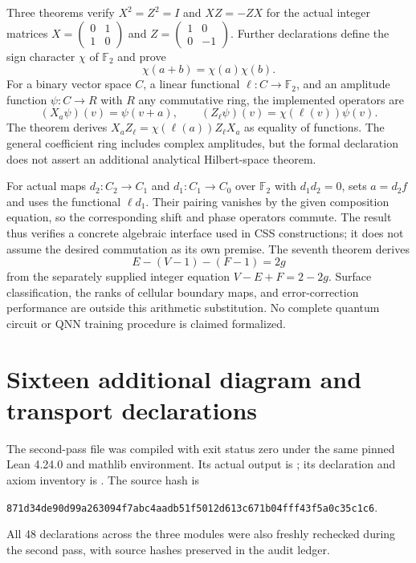 Three theorems verify $X^2=Z^2=I$ and $XZ=-ZX$ for the actual integer
matrices $X=\left(\begin{smallmatrix}0&1\\1&0\end{smallmatrix}\right)$ and
$Z=\left(\begin{smallmatrix}1&0\\0&-1\end{smallmatrix}\right)$. Further
declarations define the sign character $\chi$ of $\mathbb F_2$ and prove
\[
 \chi(a+b)=\chi(a)\chi(b).
\]
For a binary vector space $C$, a linear functional $\ell:C\to\mathbb F_2$,
and an amplitude function $\psi:C\to R$ with $R$ any commutative ring, the
implemented operators are
\[
 (X_a\psi)(v)=\psi(v+a),\qquad
 (Z_\ell\psi)(v)=\chi(\ell(v))\psi(v).
\]
The theorem  derives
$X_aZ_\ell=\chi(\ell(a))Z_\ell X_a$ as equality of functions. The general
coefficient ring includes complex amplitudes, but the formal declaration
does not assert an additional analytical Hilbert-space theorem.

For actual maps $d_2:C_2\to C_1$ and $d_1:C_1\to C_0$ over $\mathbb F_2$
with $d_1d_2=0$,  sets $a=d_2f$ and
uses the functional $\ell d_1$. Their pairing vanishes by the given
composition equation, so the corresponding shift and phase operators
commute. The result thus verifies a concrete algebraic interface used in
CSS constructions; it does not assume the desired commutation as its own
premise. The seventh theorem derives
\[
 E-(V-1)-(F-1)=2g
\]
from the separately supplied integer equation $V-E+F=2-2g$. Surface
classification, the ranks of cellular boundary maps, and error-correction
performance are outside this arithmetic substitution. No complete quantum
circuit or QNN training procedure is claimed formalized.

\section{Sixteen additional diagram and transport declarations}

The second-pass file  was compiled with exit
status zero under the same pinned Lean 4.24.0 and mathlib environment.
Its actual output is ; its declaration and
axiom inventory is . The source hash is
\begin{center}\scriptsize
\texttt{871d34de90d99a263094f7abc4aadb51f5012d613c671b04fff43f5a0c35c1c6}.
\end{center}
All 48 declarations across the three modules were also freshly rechecked
during the second pass, with source hashes preserved in the audit ledger.

